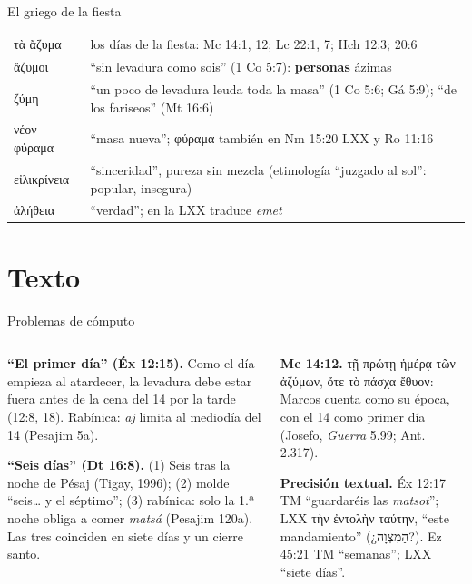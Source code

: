 \documentclass[hyperref={bookmarks=false},aspectratio=169]{beamer}
\newcommand{\heb}[1]{\mbox{\foreignlanguage{hebrew}{#1}}}
\newcommand{\grc}[1]{\foreignlanguage{ancientgreek}{#1}}
\newcommand{\destacar}[1]{\textbf{\textcolor{tierraroja}{#1}}}
\begin{document}
\begin{frame}{El griego de la fiesta}
\scriptsize\renewcommand{\arraystretch}{1.15}
\begin{tabular}{@{}L{3.1cm}L{8.9cm}@{}}
\toprule
\grc{τὰ ἄζυμα} & los días de la fiesta: Mc 14:1, 12; Lc 22:1, 7; Hch 12:3; 20:6 \\
\grc{ἄζυμοι} & ``sin levadura como sois'' (1 Co 5:7): \destacar{personas} ázimas \\
\grc{ζύμη} & ``un poco de levadura leuda toda la masa'' (1 Co 5:6; Gá 5:9); ``de los fariseos'' (Mt 16:6) \\
\grc{νέον φύραμα} & ``masa nueva''; \grc{φύραμα} también en Nm 15:20 LXX y Ro 11:16 \\
\grc{εἰλικρίνεια} & ``sinceridad'', pureza sin mezcla (etimología ``juzgado al sol'': popular, insegura) \\
\grc{ἀλήθεια} & ``verdad''; en la LXX traduce \emph{emet} \\
\bottomrule
\end{tabular}
\end{frame}

\section{Texto}

\begin{frame}{Problemas de cómputo}
\begin{columns}[t,onlytextwidth]
\begin{column}{0.49\textwidth}\scriptsize
\destacar{``El primer día'' (Éx 12:15).} Como el día empieza al atardecer, la levadura debe estar fuera antes de la cena del 14 por la tarde (12:8, 18). Rabínica: \emph{aj} limita al mediodía del 14 (Pesajim 5a).\par\medskip
\destacar{``Seis días'' (Dt 16:8).} (1) Seis tras la noche de Pésaj (Tigay, 1996); (2) molde ``seis\ldots{} y el séptimo''; (3) rabínica: solo la 1.ª noche obliga a comer \emph{matsá} (Pesajim 120a). Las tres coinciden en siete días y un cierre santo.
\end{column}
\begin{column}{0.49\textwidth}\scriptsize
\destacar{Mc 14:12.} \grc{τῇ πρώτῃ ἡμέρᾳ τῶν ἀζύμων, ὅτε τὸ πάσχα ἔθυον}: Marcos cuenta como su época, con el 14 como primer día (Josefo, \emph{Guerra} 5.99; Ant. 2.317).\par\medskip
\begin{tcolorbox}[colback=papiro,colframe=mostaza!80!tierraroja,boxrule=0.8pt,arc=2pt,left=3pt,right=3pt,top=2pt,bottom=2pt]
\textbf{Precisión textual.} Éx 12:17 TM ``guardaréis las \emph{matsot}''; LXX \grc{τὴν ἐντολὴν ταύτην}, ``este mandamiento'' (¿\heb{הַמִּצְוָה}?). Ez 45:21 TM ``semanas''; LXX ``siete días''.
\end{tcolorbox}
\end{column}
\end{columns}
\end{frame}
\end{document}
